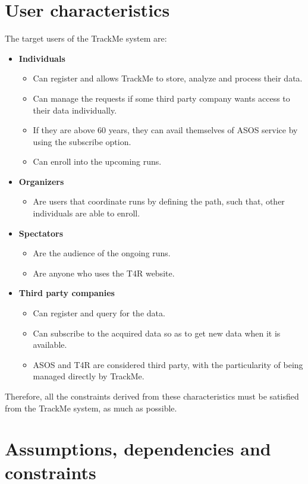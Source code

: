 \documentclass[a4paper, hidelinks, 12pt]{report}
\begin{document}
	\section{User characteristics}
	The target users of the TrackMe system are:
	\begin{itemize}
		\item{} \textbf{Individuals}
		\begin{itemize}
			\item{} Can register and allows TrackMe to store, analyze and process their data.
			\item{} Can manage the requests if some third party company wants access to their data individually.
			\item{} If they are above 60 years, they can avail themselves of ASOS service by using the subscribe option.
			\item{} Can enroll into the upcoming runs.
		\end{itemize}
		\item{} \textbf{Organizers}
		\begin{itemize}
			\item{} Are users that coordinate runs by defining the path, such that, other individuals are able to enroll.
		\end{itemize}
		
	\item{} \textbf{Spectators}
	\begin{itemize}
		\item Are the audience of the ongoing runs.
		\item Are anyone who uses the T4R website.
	\end{itemize}
		\item{} \textbf{Third party companies}
		\begin{itemize}
			\item{} Can register and query for the data.
			\item{} Can subscribe to the acquired data so as to get new data when it is available.
			\item{} ASOS and T4R are considered third party, with the particularity of being managed directly by TrackMe.
		\end{itemize}
	\end{itemize}
	
	Therefore, all the constraints derived from these characteristics must be satisfied from the TrackMe system, as much as possible.
	
	\section{Assumptions, dependencies and constraints}
\end{document}
